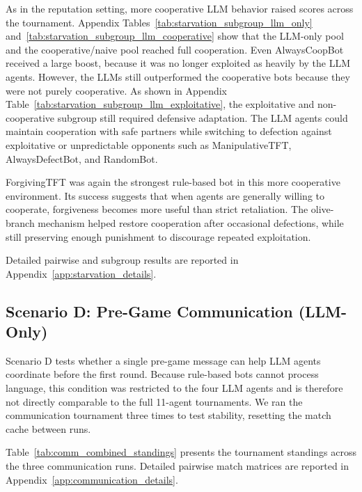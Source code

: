 \documentclass[11pt]{article}
\begin{document}
As in the reputation setting, more cooperative LLM behavior raised scores across the tournament. Appendix Tables~\ref{tab:starvation_subgroup_llm_only} and~\ref{tab:starvation_subgroup_llm_cooperative} show that the LLM-only pool and the cooperative/naive pool reached full cooperation. Even AlwaysCoopBot received a large boost, because it was no longer exploited as heavily by the LLM agents. However, the LLMs still outperformed the cooperative bots because they were not purely cooperative. As shown in Appendix Table~\ref{tab:starvation_subgroup_llm_exploitative}, the exploitative and non-cooperative subgroup still required defensive adaptation. The LLM agents could maintain cooperation with safe partners while switching to defection against exploitative or unpredictable opponents such as ManipulativeTFT, AlwaysDefectBot, and RandomBot.

ForgivingTFT was again the strongest rule-based bot in this more cooperative environment. Its success suggests that when agents are generally willing to cooperate, forgiveness becomes more useful than strict retaliation. The olive-branch mechanism helped restore cooperation after occasional defections, while still preserving enough punishment to discourage repeated exploitation.

Detailed pairwise and subgroup results are reported in Appendix~\ref{app:starvation_details}.


\subsection{Scenario D: Pre-Game Communication (LLM-Only)}

Scenario D tests whether a single pre-game message can help LLM agents coordinate before the first round. Because rule-based bots cannot process language, this condition was restricted to the four LLM agents and is therefore not directly comparable to the full 11-agent tournaments. We ran the communication tournament three times to test stability, resetting the match cache between runs.

Table~\ref{tab:comm_combined_standings} presents the tournament standings across the three communication runs. Detailed pairwise match matrices are reported in Appendix~\ref{app:communication_details}.
\end{document}
